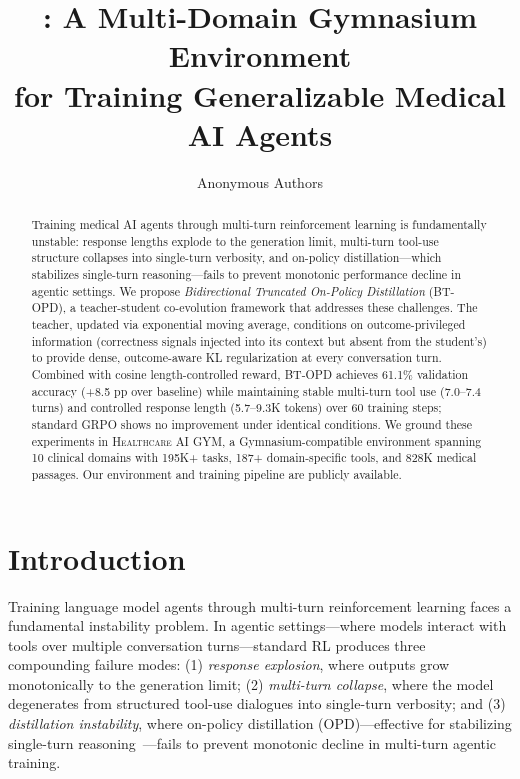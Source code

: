 \documentclass{article}
\title{\gym{}: A Multi-Domain Gymnasium Environment \\
for Training Generalizable Medical AI Agents}
\author{
  Anonymous Authors \\
}
\date{}
\newcommand{\gym}{\textsc{Healthcare AI GYM}}
\begin{document}
\maketitle

\begin{abstract}
Training medical AI agents through multi-turn reinforcement learning is fundamentally unstable: response lengths explode to the generation limit, multi-turn tool-use structure collapses into single-turn verbosity, and on-policy distillation---which stabilizes single-turn reasoning---fails to prevent monotonic performance decline in agentic settings. We propose \emph{Bidirectional Truncated On-Policy Distillation} (BT-OPD), a teacher-student co-evolution framework that addresses these challenges. The teacher, updated via exponential moving average, conditions on outcome-privileged information (correctness signals injected into its context but absent from the student's) to provide dense, outcome-aware KL regularization at every conversation turn. Combined with cosine length-controlled reward, BT-OPD achieves 61.1\% validation accuracy (+8.5 pp over baseline) while maintaining stable multi-turn tool use (7.0--7.4 turns) and controlled response length (5.7--9.3K tokens) over 60 training steps; standard GRPO shows no improvement under identical conditions. We ground these experiments in \gym{}, a Gymnasium-compatible environment spanning 10 clinical domains with 195K+ tasks, 187+ domain-specific tools, and 828K medical passages. Our environment and training pipeline are publicly available.

\end{abstract}

\section{Introduction}
\label{sec:intro}

Training language model agents through multi-turn reinforcement learning faces a fundamental instability problem. In agentic settings---where models interact with tools over multiple conversation turns---standard RL produces three compounding failure modes: (1) \emph{response explosion}, where outputs grow monotonically to the generation limit; (2) \emph{multi-turn collapse}, where the model degenerates from structured tool-use dialogues into single-turn verbosity; and (3) \emph{distillation instability}, where on-policy distillation (OPD)---effective for stabilizing single-turn reasoning~\citep{zhao26opsd, yang26rlsd}---fails to prevent monotonic decline in multi-turn agentic training.
\end{document}
